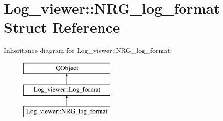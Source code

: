 \hypertarget{struct_log__viewer_1_1_n_r_g__log__format}{\section{Log\-\_\-viewer\-:\-:N\-R\-G\-\_\-log\-\_\-format Struct Reference}
\label{struct_log__viewer_1_1_n_r_g__log__format}
}
Inheritance diagram for Log\-\_\-viewer\-:\-:N\-R\-G\-\_\-log\-\_\-format\-:\begin{figure}[H]
\begin{center}
\leavevmode
\includegraphics[height=3.000000cm]{struct_log__viewer_1_1_n_r_g__log__format}
\end{center}
\end{figure}
